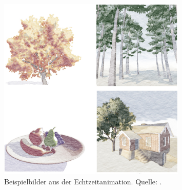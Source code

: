 \begin{figure}
  \centering
  \includegraphics[width=0.8\textwidth]{../images/Luft2006-examples}
  \caption{Beispielbilder aus der Echtzeitanimation. Quelle: \cite{Luft2006}.}
  \label{fig:wcolor-results}
\end{figure}